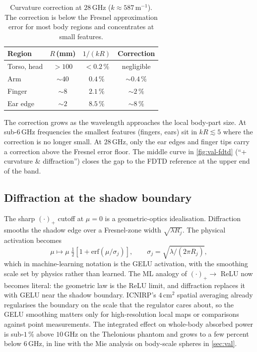 \documentclass[journal,twocolumn,10pt]{IEEEtran}
\theoremstyle{plain}
\theoremstyle{remark}
\begin{document}
\begin{table}[!t]
\centering
\caption{Curvature correction at $28\,$GHz ($k \approx 587\,$m$^{-1}$).
The correction is below the Fresnel approximation error for most
body regions and concentrates at small features.}
\label{tab:curv-mag}
\begin{tabular}{lccc}
\toprule
Region & $R$\,(mm) & $1/(kR)$ & Correction \\
\midrule
Torso, head & $> 100$ & $< 0.2\,\%$ & negligible \\
Arm         & $\sim 40$ & $0.4\,\%$ & $\sim 0.4\,\%$ \\
Finger      & $\sim 8$  & $2.1\,\%$ & $\sim 2\,\%$ \\
Ear edge    & $\sim 2$  & $8.5\,\%$ & $\sim 8\,\%$ \\
\bottomrule
\end{tabular}
\end{table}

The correction grows as the wavelength approaches the local
body-part size. At sub-$6\,$GHz frequencies the smallest features
(fingers, ears) sit in $kR \lesssim 5$ where the correction is no
longer small. At $28\,$GHz, only the ear edges and finger tips carry
a correction above the Fresnel error floor. The middle curve in
\cref{fig:val-fdtd} (``+ curvature \& diffraction'') closes the gap
to the FDTD reference at the upper end of the band.

\subsection{Diffraction at the shadow boundary}\label{subsec:corr-diff}

The sharp $(\cdot)_+$ cutoff at $\mu = 0$ is a geometric-optics
idealisation. Diffraction smooths the shadow edge over a Fresnel-zone
width $\sqrt{\lambda R_j}$. The physical activation becomes
\begin{equation}\label{eq:gelu}
  \mu \mapsto \mu\;\tfrac{1}{2}\!\left[1 + \mathrm{erf}(\mu/\sigma_j)\right],
  \qquad \sigma_j = \sqrt{\lambda / (2\pi R_j)},
\end{equation}
which in machine-learning notation is the GELU activation, with the
smoothing scale set by physics rather than learned. The ML
analogy of $(\cdot)_+ \to$ ReLU now becomes literal: the geometric
law is the ReLU limit, and diffraction replaces it with GELU near
the shadow boundary. ICNIRP's $4\,\mathrm{cm}^2$ spatial averaging
already regularises the boundary on the scale that the regulator
cares about, so the GELU smoothing matters only for high-resolution
local maps or comparisons against point measurements. The integrated
effect on whole-body absorbed power is sub-$1\,\%$ above $10\,$GHz on
the Thelonious phantom and grows to a few percent below $6\,$GHz, in
line with the Mie analysis on body-scale spheres in \cref{sec:val}.
\end{document}
